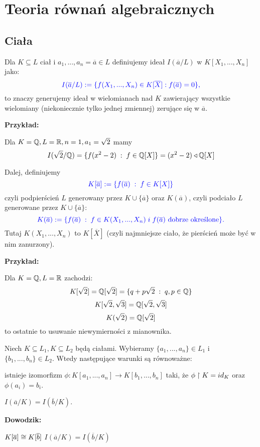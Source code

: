 \section{Teoria równań algebraicznych}

\subsection{Ciała}

Dla $K\subseteq L$ ciał i $a_1,...,a_n=\overline a\in L$ definiujemy ideał $I({\overline a}/L)$ w $K[X_1,...,X_n]$ jako:
$$\color{blue}I(\overline a /L):=\{f(X_1,...,X_n)\in K[\overline X]:f(\overline a)=0\},$$
to znaczy generujemy ideał w wielomianach nad $K$ zawierający wszystkie wielomiany (niekoniecznie tylko jednej zmiennej) zerujące się w $\overline a$. 
\medskip

\textbf{Przykład:}
\smallskip

Dla $K=\mathbb{Q},L=\mathbb{R},n=1,a_1=\sqrt{2}$ mamy
$$I(\sqrt{2}/\mathbb{Q})=\{f(x^2-2)\;:\;f\in\mathbb{Q}[X]\}=(x^2-2)\triangleleft \mathbb{Q}[X]$$

Dalej, definiujemy
$$\color{blue}K[\overline a]:=\{f(\overline a)\;:\;f\in K[X]\}$$
czyli podpierścień $L$ generowany przez $K\cup\{\overline a\}$ oraz $K(\overline a)$, czyli podciało $L$ generowane przez $K\cup\{\overline a\}$:
$$\color{blue}K(\overline a):=\{f(\overline a)\;:\;f\in K(X_1,...,X_n)\;i\;f(\overline a)\text{ dobrze określone}\}.$$
Tutaj $K(X_1,...,X_n)$ to  $K[\overline X]$ (czyli najmniejsze ciało, że pierścień może być w nim zanurzony).
\medskip

\textbf{Przykład:}
\smallskip

Dla $K=\mathbb{Q},L=\mathbb{R}$ zachodzi:
$$K[\sqrt2]=\mathbb{Q}[\sqrt2]=\{q+p\sqrt2\;:\;q,p\in\mathbb{Q}\}$$
$$K[\sqrt2,\sqrt3]=\mathbb{Q}[\sqrt2,\sqrt3]$$
$$K(\sqrt2)=\mathbb{Q}[\sqrt2]$$
to ostatnie to usuwanie niewymierności z mianownika.
\medskip

\textbf{\large{}} Niech $K\subseteq L_1,K\subseteq L_2$ będą ciałami. Wybieramy $\{a_1,...,a_n\}\in L_1$ i $\{b_1,...,b_n\}\in L_2$. Wtedy następujące warunki są równoważne:

\indent \point istnieje izomorfizm $\phi:K[a_1,...,a_n]\to K[b_1,...,b_n]$ taki, że $\phi\upharpoonright K=id_K$ oraz $\phi(a_i)=b_i$.

\indent \point $I(\overline a/K)=I(\overline b/K)$.
\smallskip

\textbf{Dowodzik:}

$K[\overline a]\cong K[\overline b]$ \acc{$\implies$} $I(\overline a/K)=I(\overline b/K)$

